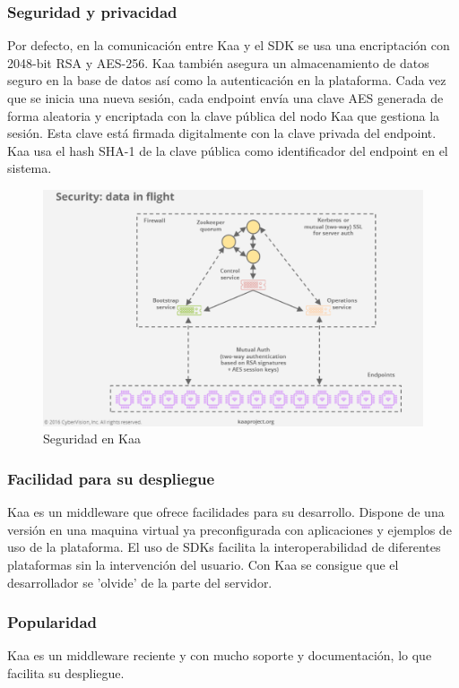 \documentclass[12pt, twoside]{book}
\begin{document}
\subsubsection*{Seguridad y privacidad}
Por defecto, en la comunicación entre Kaa y el SDK se usa una encriptación con 2048-bit RSA y AES-256. Kaa también asegura un almacenamiento de datos seguro en la base de datos así como la autenticación en la plataforma. Cada vez que se inicia una nueva sesión, cada endpoint envía una clave AES generada de forma aleatoria y encriptada con la clave pública del nodo Kaa que gestiona la sesión. 
Esta clave está firmada digitalmente con la clave privada del endpoint. Kaa usa el hash SHA-1 de la clave pública como identificador del endpoint en el sistema.
\begin{figure}[H]
\centering
\includegraphics[scale=0.5]{images/security_capture}
\caption{Seguridad en Kaa}\label{L510}
\end{figure} 
\subsubsection*{Facilidad para su despliegue} 
Kaa es un middleware que ofrece facilidades para su desarrollo. Dispone de una versión en una maquina virtual ya preconfigurada con aplicaciones y ejemplos de uso de la plataforma. El uso de SDKs facilita la interoperabilidad de diferentes plataformas sin la intervención del usuario. Con Kaa se consigue que el desarrollador se 'olvide' de la parte del servidor.
\subsubsection*{Popularidad}
Kaa es un middleware reciente y con mucho soporte y documentación, lo que facilita su despliegue.
\end{document}
